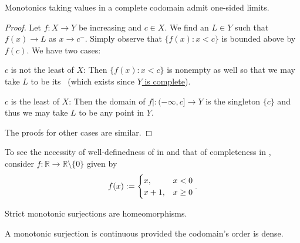 	\begin{cor}\label{COR: one-sided lims of monotonics in a complete codom}
		Monotonics taking values in a complete codomain admit one-sided limits.
	\end{cor}
	
	\begin{proof}
		Let $f\colon X\to Y$ be increasing and $c\in X$. We find an $L\in Y$ such that $f(x)\to L$ as $x\to c^-$. Simply observe that $\{f(x) : x < c\}$ is bounded above by $f(c)$. We have two cases:
		\begin{mylist}
			\item $c$ is not the least \elt of $X$: Then $\{f(x) : x < c\}$ is nonempty as well so that we may take $L$ to be its \lub\ (which exists since \uline{$Y$ is complete}).
			
			\item $c$ is the least \elt of $X$: Then the domain of $f|\colon(-\infty, c]\to Y$ is the singleton $\{c\}$ and thus we may take $L$ to be any point in $Y$.
		\end{mylist}
		The proofs for other cases are similar.
	\end{proof}
	
	\begin{rmk}
		To see the necessity of well-definedness of \RHS in  and that of completeness in , consider $f\colon \mathbb R\to\mathbb R\setminus\{0\}$ given by
		\[
		f(x) := 
		\begin{cases}
			x, & x < 0\\
			x + 1, & x \ge 0
		\end{cases}\text.
		\]
	\end{rmk}
	
	
	\begin{prp}
		\leavevmode
		\begin{mylist}
			\item Strict monotonic surjections are homeomorphisms.
			
			\item A monotonic surjection is continuous provided the codomain's order is dense.
		\end{mylist}
	\end{prp}
	
